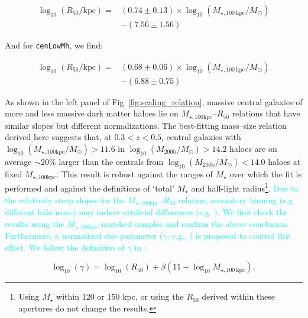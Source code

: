 \documentclass[a4paper,fleqn,usenatbib]{mnras}
\def\nbcg{\texttt{cenLowMh}}
\def\mstar{{$M_{\star}$}}
\def\logmhalo{{$\log_{10} (M_{\mathrm{200b}}/M_{\odot})$}}
\def\mtot{{$M_{\star,100\mathrm{kpc}}$}}
\def\logmtot{{$\log_{10} (M_{\star,100\mathrm{kpc}}/M_{\odot})$}}
\newcommand{\song}[1]{\textcolor{cyan}{#1}}
\begin{document}
    \begin{equation}
        \begin{aligned}
        \log_{10} (R_{\mathrm{50}}/\mathrm{kpc}) = & (0.74\pm0.13) \times \log_{10} (M_{\star, 100\ \mathrm{kpc}}/M_{\odot}) \\ & -(7.56\pm1.56)
        \end{aligned}
    \end{equation}

    \noindent And for \nbcg{}, we find:
    
    \begin{equation}
        \begin{aligned}
        \log_{10} (R_{\mathrm{50}}/\mathrm{kpc}) = & (0.68\pm0.06) \times \log_{10} (M_{\star, 100\ \mathrm{kpc}}/M_{\odot}) \\ & -(6.88\pm0.75)
        \end{aligned}
    \end{equation}
    
    \noindent As shown in the left panel of Fig~\ref{fig:scaling_relation}, 
    massive central galaxies of more and less massive dark matter haloes lie on 
    \mtot{}--$R_{\mathrm{50}}$ relations that have similar slopes but 
    different normalizations. 
    The best-fitting mass--size relation derived here suggests that, 
    at $0.3 < z < 0.5$, central galaxies with \logmtot{}$>11.6$ in \logmhalo{}$>14.2$
    haloes are on average $\sim20$\% larger than the centrals from \logmhalo{}$<14.0$
    haloes at fixed \mtot{}.
    This result is robust against the ranges of \mstar{} over which the fit is 
    performed and against the definitions of  `total' \mstar{} and half-light 
    radius\footnote{Using \mstar{} within 120 or 150 kpc, or using the 
    $R_{\mathrm{50}}$ derived within these apertures do not change the results.}. 
    \song{
    Due to the relatively steep slopes for the \mtot{}--$R_{\mathrm{50}}$ relation, 
    secondary binning (e.g. different halo mass) may induce artificial differences
    (e.g. \citealt{Sonnenfeld2017}). 
    We first check the results using the \mtot{}-matched samples and confirm 
    the above conclusion. 
    Furthermore, a normalized size parameter ($\gamma$; e.g., \citealt{Newman2012, 
    HCompany13}) is proposed to control this effect. 
    We follow the definition of $\gamma$ in \citet{HCompany13}:
    }
    
    \begin{equation}
        \log_{10}(\gamma) = \log_{10} (R_{\mathrm{50}}) + \beta (11 - \log_{10}M_{\star, 100\ \mathrm{kpc}}),
    \end{equation}
    
\end{document}
